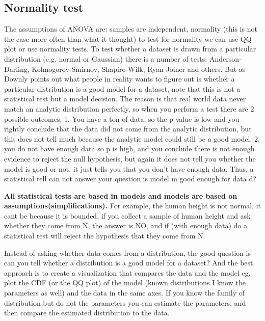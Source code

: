 \documentclass[11pt]{article}
\theoremstyle{definition}
\theoremstyle{remark}
\begin{document}
\subsection{Normality test}
\label{sse:normal}
The assumptions of ANOVA are: samples are independent, normality (this is not the case more often than what it thought) to test for normality we can use QQ plot or use normality tests. To test whether a dataset is drawn from a particular distribution (e.g. normal or Gaussian) there is a number of tests: Anderson-Darling, Kolmogorov-Smirnov, Shapiro-Wilk, Ryan-Joiner and others. 
But as Downly points out what people in reality wants to figure out is whether a particular distribution is a good model for a dataset, note that this  is not a statistical test but a model decision. The reason is that real world data never match an analytic distribution perfectly, so when you perform a test there are 2 possible outcomes:
1. You have a ton of data, so the p value is low and you rightly conclude that the data did not come from the analytic distribution, but this does not tell much because the analytic model could still be a good model. 2. you do not have enough data so p is high, and you conclude there is not enough evidence to reject the null hypothesis, but again it does not tell you whether the model is good or not, it just tells you that you don't have enough data. Thus, a statistical tell can not answer your question is model m good enough for data d?

\textbf{All statistical tests are based in models and models are based on assumptions(simplifications).}
For example, the human height is not normal, it cant be because it is bounded, if you collect a sample of human height and ask whether they come from N, the answer is NO, and if (with enough data) do a statistical test will reject the hypothesis that they come from N.

Instead of asking whether data comes from a distribution, the good question is can you tell whether a distribution is a good model for a dataset?
 And the best approach is to create a visualization that compares the data and the model eg. plot the CDF (or the QQ plot) of the model (known distributions I know the parameters as well) and the data in the same axes. If you know the family of distribution but do not the parameters you can estimate the parameters, and then compare the estimated distribution to the data.

\end{document}
